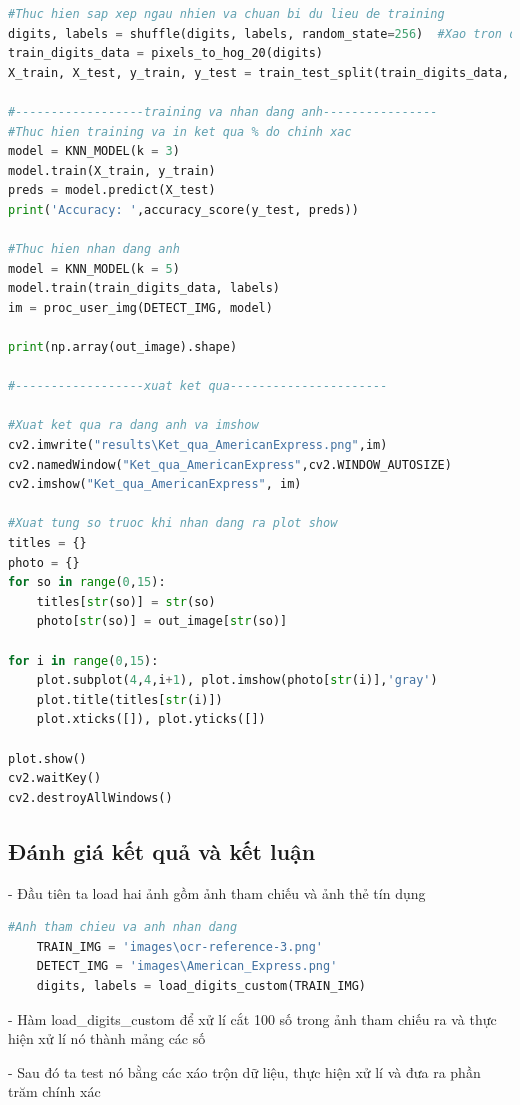 \begin{lstlisting}[language=Python, caption=Recognition American Express]
#Thuc hien sap xep ngau nhien va chuan bi du lieu de training
digits, labels = shuffle(digits, labels, random_state=256)  #Xao tron du lieu
train_digits_data = pixels_to_hog_20(digits)
X_train, X_test, y_train, y_test = train_test_split(train_digits_data, labels, test_size=0.7)

#------------------training va nhan dang anh----------------
#Thuc hien training va in ket qua % do chinh xac
model = KNN_MODEL(k = 3)
model.train(X_train, y_train)
preds = model.predict(X_test)
print('Accuracy: ',accuracy_score(y_test, preds))

#Thuc hien nhan dang anh 
model = KNN_MODEL(k = 5)
model.train(train_digits_data, labels)
im = proc_user_img(DETECT_IMG, model)

print(np.array(out_image).shape)

#------------------xuat ket qua----------------------

#Xuat ket qua ra dang anh va imshow
cv2.imwrite("results\Ket_qua_AmericanExpress.png",im)
cv2.namedWindow("Ket_qua_AmericanExpress",cv2.WINDOW_AUTOSIZE)
cv2.imshow("Ket_qua_AmericanExpress", im)

#Xuat tung so truoc khi nhan dang ra plot show
titles = {}
photo = {}
for so in range(0,15):		
    titles[str(so)] = str(so)
    photo[str(so)] = out_image[str(so)]

for i in range(0,15):
	plot.subplot(4,4,i+1), plot.imshow(photo[str(i)],'gray')
	plot.title(titles[str(i)])
    plot.xticks([]), plot.yticks([])
    
plot.show()
cv2.waitKey() 
cv2.destroyAllWindows()          

\end{lstlisting}

\subsection{Đánh giá kết quả và kết luận}


- Đầu tiên ta load hai ảnh gồm ảnh tham chiếu và ảnh thẻ tín dụng
\begin{lstlisting}[language=Python]
    #Anh tham chieu va anh nhan dang
    TRAIN_IMG = 'images\ocr-reference-3.png'
    DETECT_IMG = 'images\American_Express.png'
    digits, labels = load_digits_custom(TRAIN_IMG)
\end{lstlisting}

- Hàm load\_digits\_custom để xử lí cắt 100 số trong ảnh tham chiếu ra và thực hiện xử lí nó thành mảng các số

- Sau đó ta test nó bằng các xáo trộn dữ liệu, thực hiện xử lí và đưa ra phần trăm chính xác

